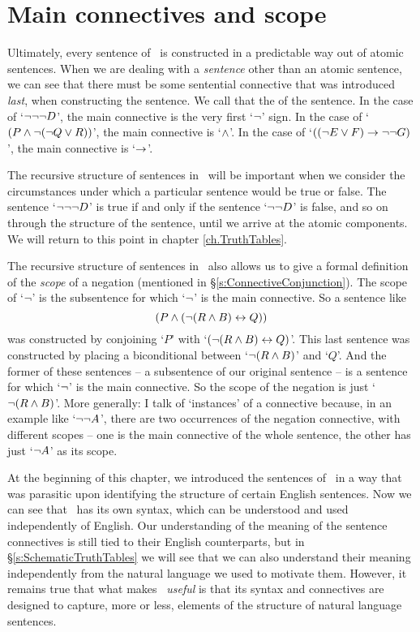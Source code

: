 \section{Main connectives and scope} 

Ultimately, every sentence of \TFL\ is constructed in a predictable way out of atomic sentences. When we are dealing with a \emph{sentence} other than an atomic sentence, we can see that there must be some sentential connective that was introduced \emph{last}, when constructing the sentence. We call that the  of the sentence. In the case of `$\neg\neg\neg D$', the main connective is the very first `$\neg$' sign. In the case of `$(P \wedge \neg (\neg Q \vee R))$', the main connective is `$\wedge$'. In the case of `$((\neg E \vee F) \rightarrow \neg\neg G)$', the main connective is `$\rightarrow$'.

The recursive structure of sentences in \TFL\ will be important when we consider the circumstances under which a particular sentence would be true or false. The sentence `$\neg \neg \neg D$' is true if and only if the sentence `$\neg \neg D$' is false, and so on through the structure of the sentence, until we arrive at the atomic components. We will return to this point in chapter \ref{ch.TruthTables}.

The recursive structure of sentences in \TFL\ also allows us to give a formal definition of the \emph{scope} of a negation (mentioned in §\ref{s:ConnectiveConjunction}). The scope of `$\neg$' is the subsentence for which `$\neg$' is the main connective. So a sentence like $$(P \wedge (\neg (R \wedge B) \leftrightarrow Q))$$ was constructed by conjoining `$P$' with `$(\neg (R \wedge B) \leftrightarrow Q)$'. This last sentence was constructed by placing a biconditional between `$\neg (R \wedge B)$' and `$Q$'. And the former of these sentences – a subsentence of our original sentence – is a sentence for which `$\neg$' is the main connective. So the scope of the negation is just `$\neg(R \wedge B)$'. More generally:
 I talk of `instances' of a connective because, in an example like `$\neg\neg A$', there are two occurrences of the negation connective, with different scopes – one is the main connective of the whole sentence, the other has just `$\neg A$' as its scope.

At the beginning of this chapter, we introduced the sentences of \TFL\ in a way that was parasitic upon identifying the structure of certain English sentences. Now we can see that \TFL\ has its own syntax, which can be understood and used independently of English. Our understanding of the meaning of the sentence connectives is still tied to their English counterparts, but in §\ref{s:SchematicTruthTables} we will see that we can also understand their meaning independently from the natural language we used to motivate them. However, it remains true that what makes \TFL\ \emph{useful} is that its syntax and connectives are designed to capture, more or less, elements of the structure of natural language sentences.

